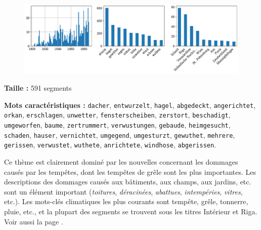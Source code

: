 \documentclass[a4paper,twoside,12pt]{article}
\begin{document}
\begin{figure}[H]
\centering
\includegraphics[width=\textwidth]{images/topic_charts_12.pdf}
\end{figure}

\begin{flushleft}
\textbf{Taille :} 591 segments

\textbf{Mots caractéristiques :} \texttt{dacher}, \texttt{entwurzelt}, \texttt{hagel}, \texttt{abgedeckt}, \texttt{angerichtet}, \texttt{orkan}, \texttt{erschlagen}, \texttt{unwetter}, \texttt{fensterscheiben}, \texttt{zerstort}, \texttt{beschadigt}, \texttt{umgeworfen}, \texttt{baume}, \texttt{zertrummert}, \texttt{verwustungen}, \texttt{gebaude}, \texttt{heimgesucht}, \texttt{schaden}, \texttt{hauser}, \texttt{vernichtet}, \texttt{umgegend}, \texttt{umgesturzt}, \texttt{gewuthet}, \texttt{mehrere}, \texttt{gerissen}, \texttt{verwustet}, \texttt{wuthete}, \texttt{anrichtete}, \texttt{windhose}, \texttt{abgerissen}.
\end{flushleft}

\noindent Ce thème est clairement dominé par les nouvelles concernant les dommages causés par les tempêtes, dont les tempêtes de grêle sont les plus importantes. Les descriptions des dommages causés aux bâtiments, aux champs, aux jardins, etc. sont un élément important (\textit{toitures}, \textit{déracinées}, \textit{abattues}, \textit{intempéries}, \textit{vitres}, etc.). Les mots-clés climatiques les plus courants sont tempête, grêle, tonnerre, pluie, etc., et la plupart des segments se trouvent sous les titres Intérieur et Riga. Voir aussi la page \pageref{about:hagel}.

\medskip
\end{document}
